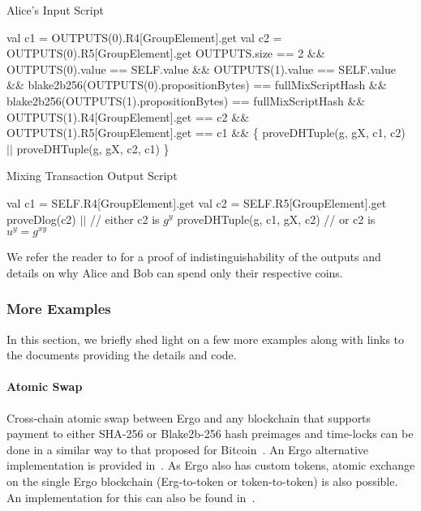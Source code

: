  \begin{algorithm}[H]
    \caption{Alice's Input Script}
    \label{alg:alice}
    \begin{algorithmic}[1]
        \State val c1 = OUTPUTS(0).R4[GroupElement].get
        \State val c2 = OUTPUTS(0).R5[GroupElement].get
        \State
        \State OUTPUTS.size == 2 \&\&
        \State OUTPUTS(0).value == SELF.value \&\&
        \State OUTPUTS(1).value == SELF.value \&\&
        \State blake2b256(OUTPUTS(0).propositionBytes) == fullMixScriptHash \&\&
        \State blake2b256(OUTPUTS(1).propositionBytes) == fullMixScriptHash \&\&
        \State OUTPUTS(1).R4[GroupElement].get == c2 \&\&
        \State OUTPUTS(1).R5[GroupElement].get == c1 \&\& \{
        \State\hspace{\algorithmicindent}  proveDHTuple(g, gX, c1, c2) $||$
        \State\hspace{\algorithmicindent}  proveDHTuple(g, gX, c2, c1)
        \State \}
    \end{algorithmic}
 \end{algorithm}

 \begin{algorithm}[H]
    \caption{Mixing Transaction Output Script}
    \label{alg:mixing-out}
    \begin{algorithmic}[1]
        \State val c1 = SELF.R4[GroupElement].get
        \State val c2 = SELF.R5[GroupElement].get
        \State proveDlog(c2) $||$            // either c2 is $g^y$
        \State proveDHTuple(g, c1, gX, c2) // or c2 is $u^y = g^{xy}$
    \end{algorithmic}
 \end{algorithm}

 We refer the reader to \cite{ergoAdvTutorial} for a proof of indistinguishability of the outputs and details on why Alice and Bob can spend only their respective coins.


\subsubsection{More Examples}

 In this section, we briefly shed light on a few more examples along with links to the documents providing the details and code.

\paragraph{Atomic Swap}
Cross-chain atomic swap between Ergo and any blockchain that supports payment to either SHA-256 or Blake2b-256 hash preimages and time-locks can be done in a similar way to that proposed for Bitcoin~\cite{Nol13}. An Ergo alternative implementation is provided in~\cite{ergoTutorial}. As Ergo also has custom tokens, atomic exchange on the single Ergo blockchain (Erg-to-token or token-to-token) is also possible. An implementation for this can also be found in~\cite{ergoTutorial}.

